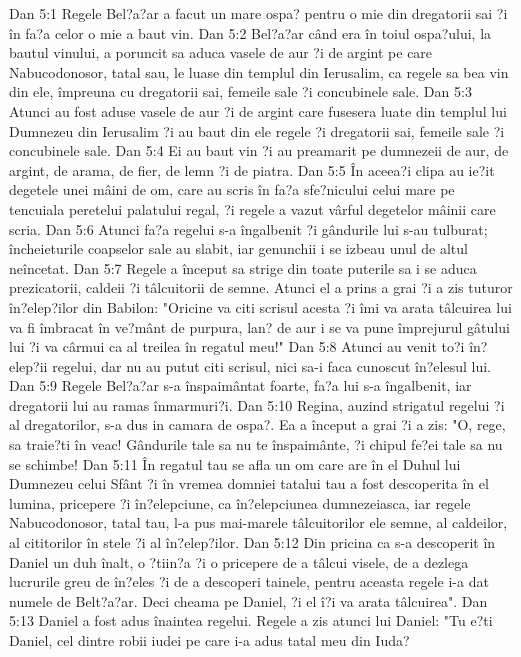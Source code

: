 Dan 5:1  Regele Bel?a?ar a facut un mare ospa? pentru o mie din dregatorii sai ?i în fa?a celor o mie a baut vin.
Dan 5:2  Bel?a?ar când era în toiul ospa?ului, la bautul vinului, a poruncit sa aduca vasele de aur ?i de argint pe care Nabucodonosor, tatal sau, le luase din templul din Ierusalim, ca regele sa bea vin din ele, împreuna cu dregatorii sai, femeile sale ?i concubinele sale.
Dan 5:3  Atunci au fost aduse vasele de aur ?i de argint care fusesera luate din templul lui Dumnezeu din Ierusalim ?i au baut din ele regele ?i dregatorii sai, femeile sale ?i concubinele sale.
Dan 5:4  Ei au baut vin ?i au preamarit pe dumnezeii de aur, de argint, de arama, de fier, de lemn ?i de piatra.
Dan 5:5  În aceea?i clipa au ie?it degetele unei mâini de om, care au scris în fa?a sfe?nicului celui mare pe tencuiala peretelui palatului regal, ?i regele a vazut vârful degetelor mâinii care scria.
Dan 5:6  Atunci fa?a regelui s-a îngalbenit ?i gândurile lui s-au tulburat; încheieturile coapselor sale au slabit, iar genunchii i se izbeau unul de altul neîncetat.
Dan 5:7  Regele a început sa strige din toate puterile sa i se aduca prezicatorii, caldeii ?i tâlcuitorii de semne. Atunci el a prins a grai ?i a zis tuturor în?elep?ilor din Babilon: "Oricine va citi scrisul acesta ?i îmi va arata tâlcuirea lui va fi îmbracat în ve?mânt de purpura, lan? de aur i se va pune împrejurul gâtului lui ?i va cârmui ca al treilea în regatul meu!"
Dan 5:8  Atunci au venit to?i în?elep?ii regelui, dar nu au putut citi scrisul, nici sa-i faca cunoscut în?elesul lui.
Dan 5:9  Regele Bel?a?ar s-a înspaimântat foarte, fa?a lui s-a îngalbenit, iar dregatorii lui au ramas înmarmuri?i.
Dan 5:10  Regina, auzind strigatul regelui ?i al dregatorilor, s-a dus in camara de ospa?. Ea a început a grai ?i a zis: "O, rege, sa traie?ti în veac! Gândurile tale sa nu te înspaimânte, ?i chipul fe?ei tale sa nu se schimbe!
Dan 5:11  În regatul tau se afla un om care are în el Duhul lui Dumnezeu celui Sfânt ?i în vremea domniei tatalui tau a fost descoperita în el lumina, pricepere ?i în?elepciune, ca în?elepciunea dumnezeiasca, iar regele Nabucodonosor, tatal tau, l-a pus mai-marele tâlcuitorilor ele semne, al caldeilor, al cititorilor în stele ?i al în?elep?ilor.
Dan 5:12  Din pricina ca s-a descoperit în Daniel un duh înalt, o ?tiin?a ?i o pricepere de a tâlcui visele, de a dezlega lucrurile greu de în?eles ?i de a descoperi tainele, pentru aceasta regele i-a dat numele de Belt?a?ar. Deci cheama pe Daniel, ?i el î?i va arata tâlcuirea".
Dan 5:13  Daniel a fost adus înaintea regelui. Regele a zis atunci lui Daniel: "Tu e?ti Daniel, cel dintre robii iudei pe care i-a adus tatal meu din Iuda?
